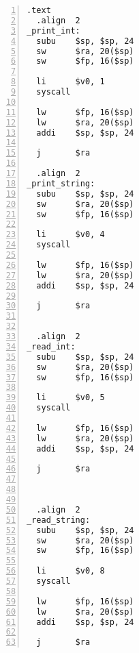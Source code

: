 \documentclass[11pt]{jarticle}
\begin{document}
\begin{lstlisting}[caption=syacalls.s,label=syscalls,numbers=left]
  .text
  .align  2
_print_int:
  subu    $sp, $sp, 24
  sw      $ra, 20($sp)
  sw      $fp, 16($sp)

  li      $v0, 1
  syscall

  lw      $fp, 16($sp)
  lw      $ra, 20($sp)
  addi    $sp, $sp, 24

  j       $ra

  .align  2
_print_string:
  subu    $sp, $sp, 24
  sw      $ra, 20($sp)
  sw      $fp, 16($sp)

  li      $v0, 4
  syscall

  lw      $fp, 16($sp)
  lw      $ra, 20($sp)
  addi    $sp, $sp, 24

  j       $ra


  .align  2
_read_int:
  subu    $sp, $sp, 24
  sw      $ra, 20($sp)
  sw      $fp, 16($sp)

  li      $v0, 5
  syscall

  lw      $fp, 16($sp)
  lw      $ra, 20($sp)
  addi    $sp, $sp, 24

  j       $ra

  

  .align  2
_read_string:
  subu    $sp, $sp, 24
  sw      $ra, 20($sp)
  sw      $fp, 16($sp)

  li      $v0, 8
  syscall

  lw      $fp, 16($sp)
  lw      $ra, 20($sp)
  addi    $sp, $sp, 24

  j       $ra
\end{lstlisting}
\end{document}
